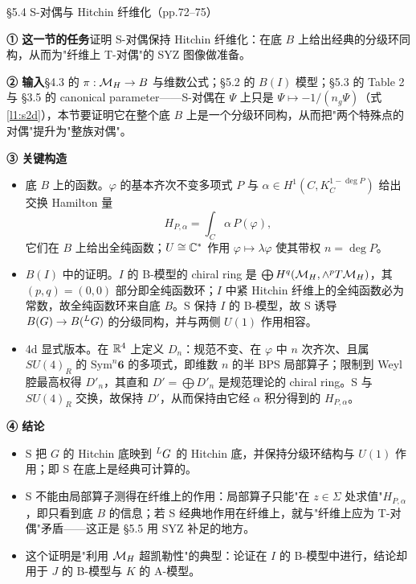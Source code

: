 \begin{kcard}{§5.4 S-对偶与 Hitchin 纤维化（pp.72--75）}

\noindent\textbf{① 这一节的任务}\quad 证明 S-对偶保持 Hitchin 纤维化：在底 $B$ 上给出经典的分级环同构，从而为"纤维上 T-对偶"的 SYZ 图像做准备。\pA{}

\noindent\textbf{② 输入}\quad \S4.3 的 $\pi:\mathcal{M}_H\to B$ 与维数公式；\S5.2 的 $B(I)$ 模型；\S5.3 的 Table 2 与 \S3.5 的 canonical parameter——S-对偶在 $\Psi$ 上只是 $\Psi\mapsto-1/(n_g\Psi)$（式 \eqref{l1:s2d}），本节要证明它在整个底 $B$ 上是一个分级环同构，从而把"两个特殊点的对偶"提升为"整族对偶"。

\noindent\textbf{③ 关键构造}\quad
\begin{itemize}
\item 底 $B$ 上的函数。$\varphi$ 的基本齐次不变多项式 $P$ 与 $\alpha\in H^1(C,K_C^{1-\deg P})$ 给出交换 Hamilton 量
\begin{equation}\label{l1:hpa37}\tag{5.37}
H_{P,\alpha}=\int_C\alpha\,P(\varphi),
\end{equation}
它们在 $B$ 上给出全纯函数；$U\cong\mathbb{C}^*$ 作用 $\varphi\mapsto\lambda\varphi$ 使其带权 $n=\deg P$。\pA{}
\item $B(I)$ 中的证明。$I$ 的 B-模型的 chiral ring 是 $\bigoplus H^q(\mathcal{M}_H,\wedge^p T\mathcal{M}_H)$，其 $(p,q)=(0,0)$ 部分即全纯函数环；$I$ 中紧 Hitchin 纤维上的全纯函数必为常数，故全纯函数环来自底 $B$。S 保持 $I$ 的 B-模型，故 S 诱导 $B(G)\to B({}^{L}G)$ 的分级同构，并与两侧 $U(1)$ 作用相容。\pA{}
\item 4d 显式版本。在 $\mathbb{R}^4$ 上定义 $D_n$：规范不变、在 $\varphi$ 中 $n$ 次齐次、且属 $SU(4)_R$ 的 $\mathrm{Sym}^n\mathbf 6$ 的多项式，即维数 $n$ 的半 BPS 局部算子；限制到 Weyl 腔最高权得 $D'_n$，其直和 $D'=\bigoplus D'_n$ 是规范理论的 chiral ring。S 与 $SU(4)_R$ 交换，故保持 $D'$，从而保持由它经 $\alpha$ 积分得到的 $H_{P,\alpha}$。\pA{}
\end{itemize}

\noindent\textbf{④ 结论}\quad
\begin{itemize}
\item S 把 $G$ 的 Hitchin 底映到 ${}^{L}G$ 的 Hitchin 底，并保持分级环结构与 $U(1)$ 作用；即 S 在底上是经典可计算的。\pA{}
\item S 不能由局部算子测得在纤维上的作用：局部算子只能"在 $z\in\Sigma$ 处求值"$H_{P,\alpha}$，即只看到底 $B$ 的信息；若 S 经典地作用在纤维上，就与"纤维上应为 T-对偶"矛盾——这正是 \S5.5 用 SYZ 补足的地方。\pA{}
\item 这个证明是"利用 $\mathcal{M}_H$ 超凯勒性"的典型：论证在 $I$ 的 B-模型中进行，结论却用于 $J$ 的 B-模型与 $K$ 的 A-模型。\pA{}
\end{itemize}


\end{kcard}
